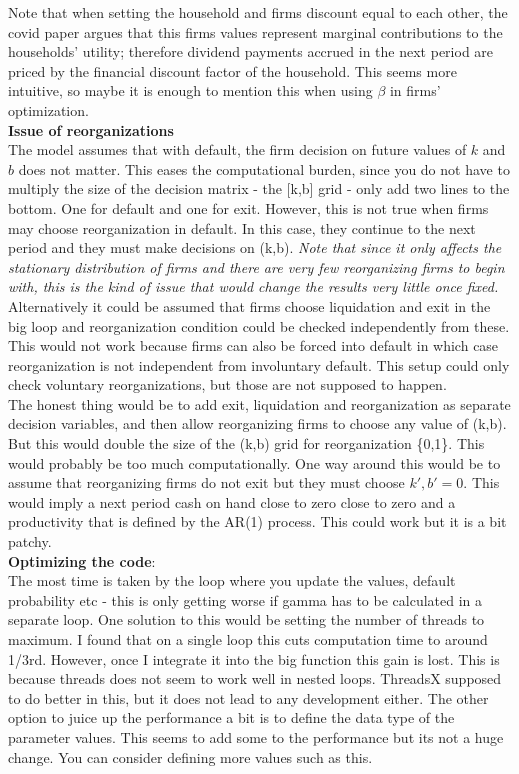 \documentclass[12pt]{article}
\begin{document}
Note that when setting the household and firms discount equal to each other, the covid paper argues that this firms values represent marginal contributions to the households' utility; therefore dividend payments accrued in the next period are priced by the financial discount factor of the household. This seems more intuitive, so maybe it is enough to mention this when using $\beta$ in firms' optimization. \vspace{3mm} \\
\textbf{Issue of reorganizations} \\
The model assumes that with default, the firm decision on future values of $k$ and $b$ does not matter. This eases the computational burden, since you do not have to multiply the size of the decision matrix - the [k,b] grid - only add two lines to the bottom. One for default and one for exit. However, this is not true when firms may choose reorganization in default. In this case, they continue to the next period and they must make decisions on (k,b). \textit{Note that since it only affects the stationary distribution of firms and there are very few reorganizing firms to begin with, this is the kind of issue that would change the results very little once fixed.} \vspace{3mm} \\
Alternatively it could be assumed that firms choose liquidation and exit in the big loop and reorganization condition could be checked independently from these. This would not work because firms can also be forced into default in which case reorganization is not independent from involuntary default. This setup could only check voluntary reorganizations, but those are not supposed to happen.  \vspace{3mm} \\
The honest thing would be to add exit, liquidation and reorganization as separate decision variables, and then allow reorganizing firms to choose any value of (k,b). But this would double the size of the (k,b) grid for reorganization \{0,1\}. This would probably be too much computationally. One way around this would be to assume that reorganizing firms do not exit but they must choose $k',b' = 0$. This would imply a next period cash on hand close to zero close to zero and a productivity that is defined by the AR(1) process. This could work but it is a bit patchy. \vspace{3mm} \\ 
\textbf{Optimizing the code}: \\
The most time is taken by the loop where you update the values, default probability etc - this is only getting worse if gamma has to be calculated in a separate loop. One solution to this would be setting the number of threads to maximum. I found that on a single loop this cuts computation time to around 1/3rd. However, once I integrate it into the big function this gain is lost. This is because threads does not seem to work well in nested loops. ThreadsX supposed to do better in this, but it does not lead to any development either.  The other option to juice up the performance a bit is to define the data type of the parameter values. This seems to add some to the performance but its not a huge change. You can consider defining more values such as this.
 
\end{document}
